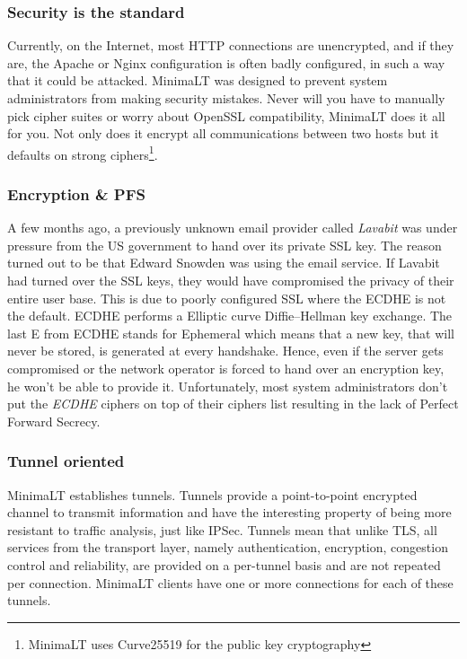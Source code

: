 \documentclass{vldb}
\begin{document}
\subsubsection{Security is the standard}

Currently, on the Internet, most HTTP connections are unencrypted, and if they are, the Apache or Nginx configuration is often badly configured, in such a way that it could be attacked. MinimaLT was designed to prevent system administrators from making security mistakes. Never will you have to manually pick cipher suites or worry about OpenSSL compatibility, MinimaLT does it all for you. Not only does it encrypt all communications between two hosts but it defaults on strong ciphers\footnote{MinimaLT uses Curve25519 for the public key cryptography}.

\subsubsection{Encryption \& PFS}

A few months ago, a previously unknown email provider called \emph{Lavabit} was under pressure from the US government to hand over its private SSL key. The reason turned out to be that Edward Snowden was using the email service. If Lavabit had turned over the SSL keys, they would have compromised the privacy of their entire user base. This is due to poorly configured SSL where the ECDHE is not the default. ECDHE performs a Elliptic curve Diffie–Hellman key exchange. The last E from ECDHE stands for Ephemeral which means that a new key, that will never be stored, is generated at every handshake. Hence, even if the server gets compromised or the network operator is forced to hand over an encryption key, he won't be able to provide it. Unfortunately, most system administrators don't put the \emph{ECDHE} ciphers on top of their ciphers list resulting in the lack of Perfect Forward Secrecy.

\subsubsection{Tunnel oriented}

MinimaLT establishes tunnels. Tunnels provide a point-to-point encrypted channel to transmit information and have the interesting property of being more resistant to traffic analysis, just like IPSec. Tunnels mean that unlike TLS, all services from the transport layer, namely authentication, encryption, congestion control and reliability, are provided on a per-tunnel basis and are not repeated per connection. MinimaLT clients have one or more connections for each of these tunnels.
\end{document}
